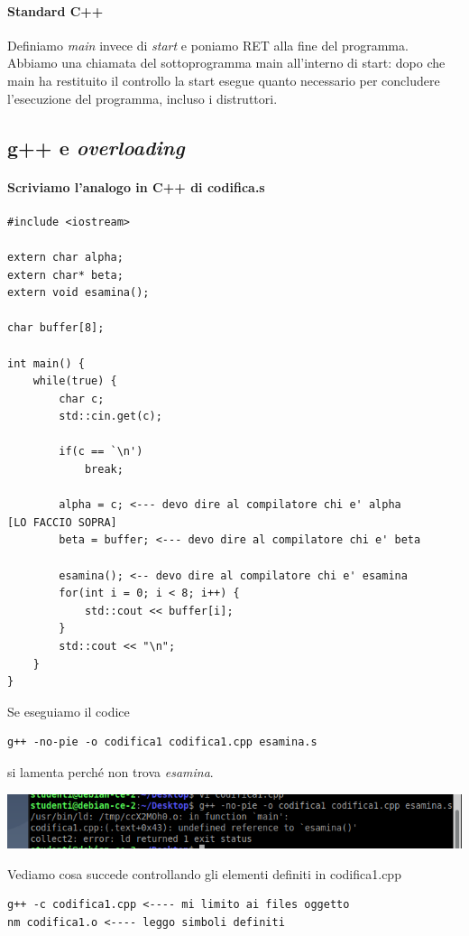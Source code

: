 \documentclass[11pt]{report}
\theoremstyle{definition}
\begin{document}
\paragraph{Standard C++}  Definiamo \emph{main} invece di \emph{start} e poniamo RET alla fine del programma. Abbiamo una chiamata del sottoprogramma main all'interno di start: dopo che main ha restituito il controllo la start esegue quanto necessario per concludere l'esecuzione del programma, incluso i distruttori.
\subsection{g++ e \emph{overloading}}
\paragraph{Scriviamo l'analogo in C++ di codifica.s}
\begin{verbatim}
#include <iostream>

extern char alpha; 
extern char* beta;
extern void esamina();

char buffer[8];

int main() {
    while(true) {
        char c;
        std::cin.get(c);
        
        if(c == `\n')
            break;
             
        alpha = c; <--- devo dire al compilatore chi e' alpha          [LO FACCIO SOPRA]
        beta = buffer; <--- devo dire al compilatore chi e' beta
        
        esamina(); <-- devo dire al compilatore chi e' esamina
        for(int i = 0; i < 8; i++) {
        	std::cout << buffer[i];
        }
        std::cout << "\n";
    }
}
\end{verbatim}
\clearpage
\noindent Se eseguiamo il codice
\begin{verbatim}
g++ -no-pie -o codifica1 codifica1.cpp esamina.s
\end{verbatim}
si lamenta perché non trova \emph{esamina}. 
\begin{center}
	\includegraphics{img/151.PNG}
\end{center} 
Vediamo cosa succede controllando gli elementi definiti in codifica1.cpp
\begin{verbatim}
g++ -c codifica1.cpp <---- mi limito ai files oggetto
nm codifica1.o <---- leggo simboli definiti
\end{verbatim}
\end{document}
